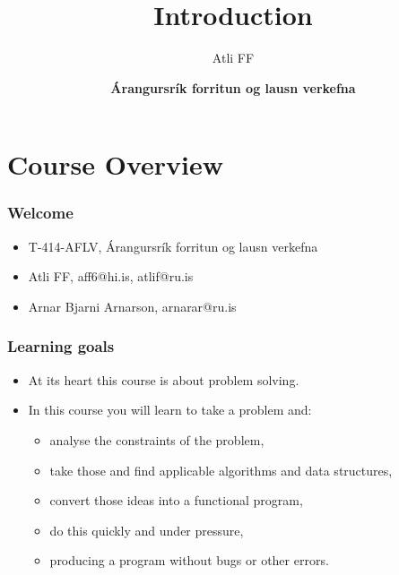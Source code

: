 \documentclass{beamer}
\title{Introduction}
\author{Atli FF}
\institute{\href{http://ru.is/td}{School of Computer Science} \\[2pt] \href{http://ru.is}{Reykjavík University}}
\date{\textbf{Árangursrík forritun og lausn verkefna}}
\begin{document}
\begin{frame}[plain]
    \titlepage
\end{frame}

\section*{Course Overview}

\begin{frame}[plain]
	\frametitle{Welcome}
	\begin{itemize}
		 \item T-414-AFLV, Árangursrík forritun og lausn verkefna
         \vspace{10pt}
        \item Atli FF, {\alert{aff6@hi.is}, \alert{atlif@ru.is}}
         \item Arnar Bjarni Arnarson, {\alert{arnarar@ru.is}}
	\end{itemize}
\end{frame}

\begin{frame}[plain]
	\frametitle{Learning goals}
	\begin{itemize}
		 \item At its heart this course is about problem solving.
		 \item In this course you will learn to take a problem and:
		 \begin{itemize}
		 	\item analyse the constraints of the problem,
		 	\item take those and find applicable algorithms and data structures,
		 	\item convert those ideas into a functional program,
		 	\item do this quickly and under pressure,
		 	\item producing a program without bugs or other errors.
		 \end{itemize}
	\end{itemize}
\end{frame}
\end{document}
